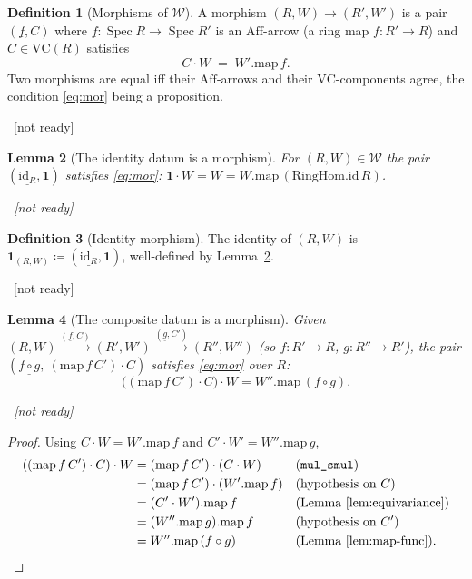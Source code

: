 \documentclass[11pt]{article}
\newcommand{\lean}[1]{\par\smallskip\noindent{\footnotesize\texttt{Lean:\ #1}}\par}
\newcommand{\uses}[1]{}
\newcommand{\notready}{{\footnotesize\textcolor{red!60!black}{\ [not ready]}}}
\theoremstyle{definition}
\newtheorem{definition}{Definition}[section]
\theoremstyle{plain}
\newtheorem{lemma}[definition]{Lemma}
\theoremstyle{remark}
\newcommand{\Aff}{\mathrm{Aff}}
\newcommand{\Spec}{\operatorname{Spec}}
\newcommand{\Weier}{\mathcal{W}}
\newcommand{\VC}{\mathrm{VC}}
\newcommand{\id}{\mathrm{id}}
\newcommand{\map}{\mathrm{map}}
\newcommand{\onel}{\mathbf 1}
\begin{document}
\begin{definition}[Morphisms of $\Weier$]\label{def:total-hom}
A morphism $(R,W)\to(R',W')$ is a pair $(\underline f,C)$ where
$\underline f:\Spec R\to\Spec R'$ is an $\Aff$-arrow (a ring map $f:R'\to R$) and
$C\in\VC(R)$ satisfies
\begin{equation}\label{eq:mor}
   C\cdot W \;=\; W'.\map\,f .
\end{equation}
Two morphisms are equal iff their $\Aff$-arrows and their $\VC$-components agree,
the condition \eqref{eq:mor} being a proposition.
\lean{}\notready
\uses{def:total-obj,def:vc,def:vc-map,conv:aff}
\end{definition}

\begin{lemma}[The identity datum is a morphism]\label{lem:id-welldef}
For $(R,W)\in\Weier$ the pair $(\underline{\id_R},\onel)$ satisfies \eqref{eq:mor}:
$\onel\cdot W=W=W.\map\,(\mathrm{RingHom.id}\,R)$.
\lean{}\notready
\uses{def:total-hom,lem:map-func,def:vc}
\end{lemma}

\begin{definition}[Identity morphism]\label{def:total-id}
The identity of $(R,W)$ is $\onel_{(R,W)}\coloneqq(\underline{\id_R},\onel)$,
well-defined by Lemma~\ref{lem:id-welldef}.
\lean{}\notready
\uses{lem:id-welldef}
\end{definition}

\begin{lemma}[The composite datum is a morphism]\label{lem:comp-welldef}
Given
$(R,W)\xrightarrow{(\underline f,C)}(R',W')\xrightarrow{(\underline g,C')}(R'',W'')$
(so $f:R'\to R$, $g:R''\to R'$), the pair
$(\underline{f\circ g},\ (\map\,f\,C')\cdot C)$ satisfies \eqref{eq:mor} over $R$:
\[
   \bigl((\map\,f\,C')\cdot C\bigr)\cdot W=W''.\map\,(f\circ g).
\]
\lean{}\notready
\uses{def:total-hom,lem:equivariance,lem:map-func}
\end{lemma}
\begin{proof}
Using $C\cdot W=W'.\map\,f$ and $C'\cdot W'=W''.\map\,g$,
\[
\begin{aligned}
 ((\map\,f\,C')\cdot C)\cdot W
   &=(\map\,f\,C')\cdot(C\cdot W)          &&\text{(\texttt{mul\_smul})}\\
   &=(\map\,f\,C')\cdot(W'.\map\,f)         &&\text{(hypothesis on }C)\\
   &=(C'\cdot W').\map\,f                    &&\text{(Lemma~\ref{lem:equivariance})}\\
   &=(W''.\map\,g).\map\,f                   &&\text{(hypothesis on }C')\\
   &=W''.\map\,(f\circ g)                    &&\text{(Lemma~\ref{lem:map-func}).}
\end{aligned}
\]
\end{proof}
\end{document}

